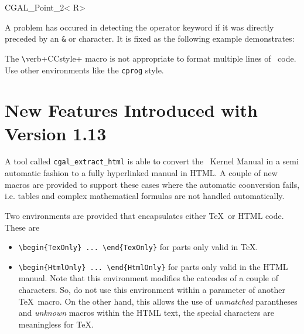 \documentclass[12pt]{article}
\begin{document}
\begin{classtemplate}{CGAL_Point_2< R>}
\end{classtemplate}

A problem has occured in detecting the operator keyword if it was
directly preceded by an {\tt \&} or {\tt *} character. It is fixed as
the following example demonstrates:


%
%

The \verb+\+verb+CCstyle+ macro is not appropriate to format multiple lines
of \CC\ code. Use other environments like the {\tt cprog} style.


\section{New Features Introduced with Version 1.13}

A tool called {\tt cgal\_extract\_html} is able to convert the \cgal\
Kernel Manual in a semi automatic fashion to a fully hyperlinked
manual in HTML. A couple of new macros are provided to support these
cases where the automatic coonversion fails, i.e. tables and complex
mathematical formulas are not handled automatically.

Two environments are provided that encapsulates either \TeX\ or HTML
code. These are 

\begin{itemize}
    \item
        \verb+\begin{TexOnly} ... \end{TexOnly}+ for parts only valid
        in \TeX.
    \item
        \verb+\begin{HtmlOnly} ... \end{HtmlOnly}+ for parts only valid
        in the HTML manual. Note that this environment modifies the 
        catcodes of a couple of characters. So, do not use this
        environment within a parameter of another \TeX\ macro. On the
        other hand, this allows the use of {\em unmatched} parantheses
        and {\em unknown} macros within the HTML text, the special
        characters are meaningless for \TeX.
\end{itemize}
\end{document}
